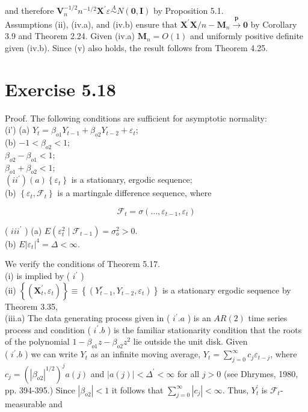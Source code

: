 \documentclass[10pt]{article}
\begin{document}
and therefore $\mathbf{V}_{n}^{-1 / 2} n^{-1 / 2} \mathbf{X}^{\prime} \varepsilon \stackrel{A}{\sim} N(\mathbf{0}, \mathbf{I})$ by Proposition 5.1.\\
Assumptions (ii), (iv.a), and (iv.b) ensure that $\mathbf{X}^{\prime} \mathbf{X} / n-\mathbf{M}_{n} \xrightarrow{\boldsymbol{p}} \mathbf{0}$ by Corollary 3.9 and Theorem 2.24. Given (iv.a) $\mathbf{M}_{n}=O(1)$ and uniformly positive definite given (iv.b). Since (v) also holds, the result follows from Theorem 4.25.

\section*{Exercise 5.18}
Proof. The following conditions are sufficient for asymptotic normality:\\
(i') (a) $Y_{t}=\beta_{o 1} Y_{t-1}+\beta_{o 2} Y_{t-2}+\varepsilon_{t}$;\\
(b) $-1<\beta_{o 2}<1$;\\
$\beta_{o 2}-\beta_{o 1}<1 ;$\\
$\beta_{o 1}+\beta_{o 2}<1 ;$\\
$\left(i i^{\prime}\right)(a)\left\{\varepsilon_{t}\right\}$ is a stationary, ergodic sequence;\\
(b) $\left\{\varepsilon_{t}, \mathcal{F}_{t}\right\}$ is a martingale difference sequence, where

$$
\mathcal{F}_{t}=\sigma\left(\ldots, \varepsilon_{t-1}, \varepsilon_{t}\right)
$$

( $i i i^{\prime}$ ) (a) $E\left(\varepsilon_{t}^{2} \mid \mathcal{F}_{t-1}\right)=\sigma_{o}^{2}>0$.\\
(b) $E\left|\varepsilon_{t}\right|^{4}=\Delta<\infty$.

We verify the conditions of Theorem 5.17.\\
(i) is implied by ( $i^{\prime}$ )\\
(ii) $\left\{\left(\mathbf{X}_{t}^{\prime}, \varepsilon_{t}\right)\right\} \equiv\left\{\left(Y_{t-1}^{r}, Y_{t-2}, \varepsilon_{t}\right)\right\}$ is a stationary ergodic sequence by Theorem 3.35,\\
(iii.a) The data generating process given in ( $i^{\prime} . a$ ) is an $A R(2)$ time series process and condition ( $i^{\prime} . b$ ) is the familiar stationarity condition that the roots of the polynomial $1-\beta_{o 1} z-\beta_{o 2} z^{2}$ lie outside the unit disk. Given\\
( $i^{\prime} . b$ ) we can write $Y_{t}$ as an infinite moving average, $Y_{t}=\sum_{j=0}^{\infty} c_{j} \varepsilon_{t-j}$, where $c_{j}=\left(\left|\beta_{o 2}\right|^{1 / 2}\right)^{j} a(j)$ and $|a(j)|<\Delta^{\prime}<\infty$ for all $j>0$ (see Dhrymes, 1980, pp. 394-395.) Since $\left|\beta_{o 2}\right|<1$ it follows that $\sum_{j=0}^{\infty}\left|c_{j}\right|<\infty$. Thus, $Y_{t}^{\prime}$ is $\mathcal{F}_{t}$-measurable and
\end{document}
